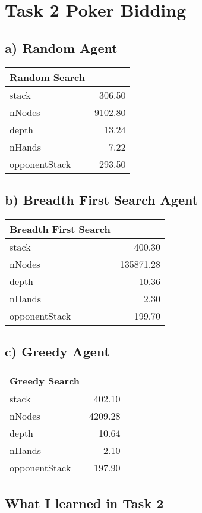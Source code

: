 \documentclass{article}
\begin{document}
\newpage
\section{Task 2 Poker Bidding}

\subsection{a) Random Agent}
\begin{tabular}{lr}
    \toprule
    {Random Search} &        \\
    \midrule
    stack         &   306.50 \\
    nNodes        &  9102.80 \\
    depth         &    13.24 \\
    nHands        &     7.22 \\
    opponentStack &   293.50 \\
    \bottomrule
\end{tabular}

\subsection{b) Breadth First Search Agent}
\begin{tabular}{lr}
    \toprule
    {Breadth First Search} &   \\
    \midrule
    stack         &     400.30 \\
    nNodes        &  135871.28 \\
    depth         &      10.36 \\
    nHands        &       2.30 \\
    opponentStack &     199.70 \\
    \bottomrule
\end{tabular}

\subsection{c) Greedy Agent}

    \begin{tabular}{lr}
        \toprule
        {Greedy Search} &        \\
        \midrule
        stack         &   402.10 \\
        nNodes        &  4209.28 \\
        depth         &    10.64 \\
        nHands        &     2.10 \\
        opponentStack &   197.90 \\
        \bottomrule
    \end{tabular}

\subsection{What I learned in Task 2}
\end{document}
